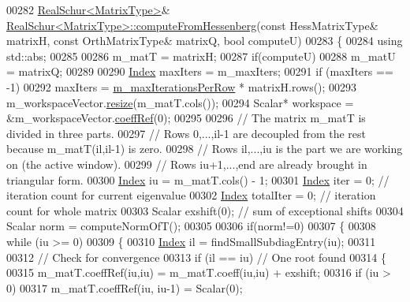 \begin{DoxyCode}
00282 \hyperlink{group___eigenvalues___module}{RealSchur<MatrixType>}& 
      \hyperlink{group___eigenvalues___module_ac4acc917dcaddefae5f35acd2c536d65}{RealSchur<MatrixType>::computeFromHessenberg}(\textcolor{keyword}{const} 
      HessMatrixType& matrixH, \textcolor{keyword}{const} OrthMatrixType& matrixQ,  \textcolor{keywordtype}{bool} computeU)
00283 \{
00284   \textcolor{keyword}{using} std::abs;
00285 
00286   m\_matT = matrixH;
00287   \textcolor{keywordflow}{if}(computeU)
00288     m\_matU = matrixQ;
00289   
00290   \hyperlink{group___eigenvalues___module_a8bd4653e2d9569a44ecc95e746422d3f}{Index} maxIters = m\_maxIters;
00291   \textcolor{keywordflow}{if} (maxIters == -1)
00292     maxIters = \hyperlink{group___eigenvalues___module_ab42163ff22cd3ad98aa2bde39b4bbc79}{m\_maxIterationsPerRow} * matrixH.rows();
00293   m\_workspaceVector.\hyperlink{class_eigen_1_1_plain_object_base_a99d9054ee2d5a40c6e00ded0265e9cea}{resize}(m\_matT.cols());
00294   Scalar* workspace = &m\_workspaceVector.\hyperlink{class_eigen_1_1_plain_object_base_a25626a55b26a4323565f79d1b7c48ea8}{coeffRef}(0);
00295 
00296   \textcolor{comment}{// The matrix m\_matT is divided in three parts. }
00297   \textcolor{comment}{// Rows 0,...,il-1 are decoupled from the rest because m\_matT(il,il-1) is zero. }
00298   \textcolor{comment}{// Rows il,...,iu is the part we are working on (the active window).}
00299   \textcolor{comment}{// Rows iu+1,...,end are already brought in triangular form.}
00300   \hyperlink{group___eigenvalues___module_a8bd4653e2d9569a44ecc95e746422d3f}{Index} iu = m\_matT.cols() - 1;
00301   \hyperlink{group___eigenvalues___module_a8bd4653e2d9569a44ecc95e746422d3f}{Index} iter = 0;      \textcolor{comment}{// iteration count for current eigenvalue}
00302   \hyperlink{group___eigenvalues___module_a8bd4653e2d9569a44ecc95e746422d3f}{Index} totalIter = 0; \textcolor{comment}{// iteration count for whole matrix}
00303   Scalar exshift(0);   \textcolor{comment}{// sum of exceptional shifts}
00304   Scalar norm = computeNormOfT();
00305 
00306   \textcolor{keywordflow}{if}(norm!=0)
00307   \{
00308     \textcolor{keywordflow}{while} (iu >= 0)
00309     \{
00310       \hyperlink{group___eigenvalues___module_a8bd4653e2d9569a44ecc95e746422d3f}{Index} il = findSmallSubdiagEntry(iu);
00311 
00312       \textcolor{comment}{// Check for convergence}
00313       \textcolor{keywordflow}{if} (il == iu) \textcolor{comment}{// One root found}
00314       \{
00315         m\_matT.coeffRef(iu,iu) = m\_matT.coeff(iu,iu) + exshift;
00316         \textcolor{keywordflow}{if} (iu > 0)
00317           m\_matT.coeffRef(iu, iu-1) = Scalar(0);

\end{DoxyCode}
